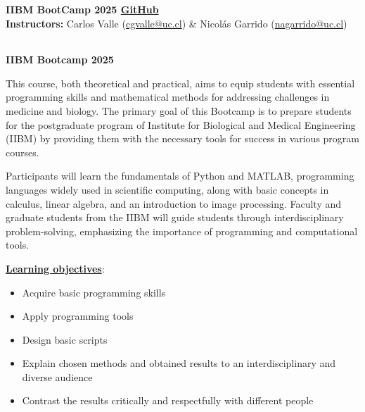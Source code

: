 \documentclass[letter,11pt]{article}
\begin{document}
	\begin{flushleft}\small
		\large{\textbf{IIBM BootCamp 2025 \href{https://github.com/cgvalle/IIBM-BootCamp-2025}{GitHub}}}\\
		\textbf{Instructors: } Carlos Valle (\href{mailto:cgvalle@uc.cl}{cgvalle@uc.cl})  \& Nicolás Garrido (\href{mailto:nagarrido@uc.cl}{nagarrido@uc.cl})
		\hspace{-0.37cm} \begin{tabular}{llllll}

\end{tabular}
\end{flushleft}





\begin{center}
\LARGE\textbf{IIBM Bootcamp 2025}\\
\end{center}



\large
This course, both theoretical and practical, aims to equip students with essential programming skills and mathematical methods for addressing challenges in medicine and biology. The primary goal of this Bootcamp is to prepare students for the postgraduate program of Institute for Biological and Medical Engineering (IIBM) by providing them with the necessary tools for success in various program courses.

Participants will learn the fundamentals of Python and MATLAB, programming languages widely used in scientific computing, along with basic concepts in calculus, linear algebra, and an introduction to image processing. Faculty and graduate students from the IIBM will guide students through interdisciplinary problem-solving, emphasizing the importance of programming and computational tools.

\vspace{0.3cm}

\underline{\textbf{Learning objectives}}:
\begin{itemize}
    \itemsep0em
    \item Acquire basic programming skills
    \item Apply programming tools
    \item Design basic scripts
    \item Explain chosen methods and obtained results to an interdisciplinary and diverse audience
    \item Contrast the results critically and respectfully with different people
    
\end{itemize}
\end{document}

